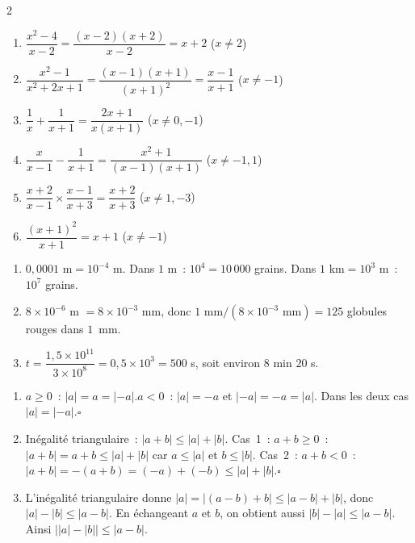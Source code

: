 
\begin{multicols}{2}
\begin{enumerate}
  \item $\dfrac{x^2-4}{x-2}=\dfrac{(x-2)(x+2)}{x-2}=x+2$ ($x\ne2$)
  \item $\dfrac{x^2-1}{x^2+2x+1}=\dfrac{(x-1)(x+1)}{(x+1)^2}=\dfrac{x-1}{x+1}$ ($x\ne-1$)
  \item $\dfrac1x+\dfrac1{x+1}=\dfrac{2x+1}{x(x+1)}$
        ($x\ne0,-1$)
  \item $\dfrac{x}{x-1}-\dfrac1{x+1}
        =\dfrac{x^2+1}{(x-1)(x+1)}$ ($x\ne-1,1$)
  \item $\dfrac{x+2}{x-1}\times\dfrac{x-1}{x+3}
        =\dfrac{x+2}{x+3}$ ($x\ne1,-3$)
  \item $\dfrac{(x+1)^2}{x+1}=x+1$ ($x\ne-1$)
\end{enumerate}
\end{multicols}


\begin{enumerate}
  \item $0{,}0001\text{ m}=10^{-4}\text{ m}$.
        Dans $1\text{ m}$~: $10^4=10\,000$ grains. Dans $1\text{ km}=10^3\text{ m}$~:
        $10^7$ grains.
  \item $8\times10^{-6}$ m $=8\times10^{-3}$ mm, donc $1\text{ mm}/(8\times10^{-3}\text{ mm})=125$ globules rouges dans $1$~mm.
  \item $t=\dfrac{1{,}5\times10^{11}}{3\times10^{8}}=0{,}5\times10^{3}=500$ s, soit environ $8$ min $20$ s.
\end{enumerate}


\begin{enumerate}
  \item $a\geq0$~: $|a|=a=|-a|$.\quad $a<0$~: $|a|=-a$ et $|-a|=-a=|a|$.
        Dans les deux cas $|a|=|-a|$.\hfill$\square$
  \item In\'egalit\'e triangulaire~: $|a+b|\leq|a|+|b|$.
        Cas~1~: $a+b\geq0$~: $|a+b|=a+b\leq|a|+|b|$ car $a\leq|a|$ et $b\leq|b|$.
        Cas~2~: $a+b<0$~: $|a+b|=-(a+b)=(-a)+(-b)\leq|a|+|b|$.\hfill$\square$
  \item L'in\'egalit\'e triangulaire donne
        $|a|=|(a-b)+b|\leq|a-b|+|b|$, donc $|a|-|b|\leq|a-b|$.
        En \'echangeant $a$ et $b$, on obtient aussi
        $|b|-|a|\leq|a-b|$. Ainsi $\bigl||a|-|b|\bigr|\leq|a-b|$.
\end{enumerate}

